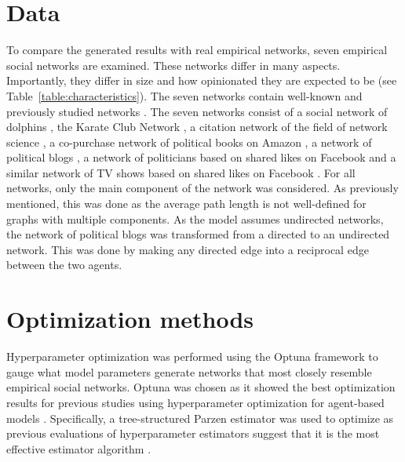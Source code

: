 \documentclass[11pt]{article}
\begin{document}
\section{Data}
To compare the generated results with real empirical networks, seven empirical social networks are examined. These networks differ in many aspects. Importantly, they differ in size and how opinionated they are expected to be (see Table~\ref{table:characteristics}). The seven networks contain well-known and previously studied networks \cite{rossi_network_2015}. The seven networks consist of a social network of dolphins \cite{lusseau_bottlenose_2003}, the Karate Club Network \cite{zachary_information_1977}, a citation network of the field of network science \cite{newman_finding_2006}, a co-purchase network of political books on Amazon \cite{shi_millions_2017}, a network of political blogs \cite{adamic_political_2005}, a network of politicians based on shared likes on Facebook and a similar network of TV shows based on shared likes on Facebook \cite{rozemberczki2019gemsec}. For all networks, only the main component of the network was considered. As previously mentioned, this was done as the average path length is not well-defined for graphs with multiple components. As the model assumes undirected networks, the network of political blogs was transformed from a directed to an undirected network. This was done by making any directed edge into a reciprocal edge between the two agents.

\section{Optimization methods}
Hyperparameter optimization was performed using the Optuna framework \cite{akiba_optuna_2019} to gauge what model parameters generate networks that most closely resemble empirical social networks. Optuna was chosen as it showed the best optimization results for previous studies using hyperparameter optimization for agent-based models \cite{kerr2021covasim}. Specifically, a tree-structured Parzen estimator was used to optimize as previous evaluations of hyperparameter estimators suggest that it is the most effective estimator algorithm \cite{akiba_optuna_2019, bergstra_algorithms_2011, hutter2014efficient}. 
\end{document}
